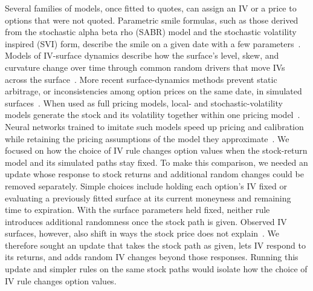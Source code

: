 Several families of models, once fitted to quotes, can assign an IV or a price to options that were not quoted. Parametric smile formulas, such as those derived from the stochastic alpha beta rho (SABR) model and the stochastic volatility inspired (SVI) form, describe the smile on a given date with a few parameters~\citep{hagan2002,gatheral2004}. Models of IV-surface dynamics describe how the surface's level, skew, and curvature change over time through common random drivers that move IVs across the surface~\citep{cont2002}. More recent surface-dynamics methods prevent static arbitrage, or inconsistencies among option prices on the same date, in simulated surfaces~\citep{cont2023}. When used as full pricing models, local- and stochastic-volatility models generate the stock and its volatility together within one pricing model~\citep{dupire1994,derman1994,heston1993}. Neural networks trained to imitate such models speed up pricing and calibration while retaining the pricing assumptions of the model they approximate~\citep{horvath2021,bayer2019}. We focused on how the choice of IV rule changes option values when the stock-return model and its simulated paths stay fixed. To make this comparison, we needed an update whose response to stock returns and additional random changes could be removed separately. Simple choices include holding each option's IV fixed or evaluating a previously fitted surface at its current moneyness and remaining time to expiration. With the surface parameters held fixed, neither rule introduces additional randomness once the stock path is given. Observed IV surfaces, however, also shift in ways the stock price does not explain~\citep{cont2002}. We therefore sought an update that takes the stock path as given, lets IV respond to its returns, and adds random IV changes beyond those responses. Running this update and simpler rules on the same stock paths would isolate how the choice of IV rule changes option values.

